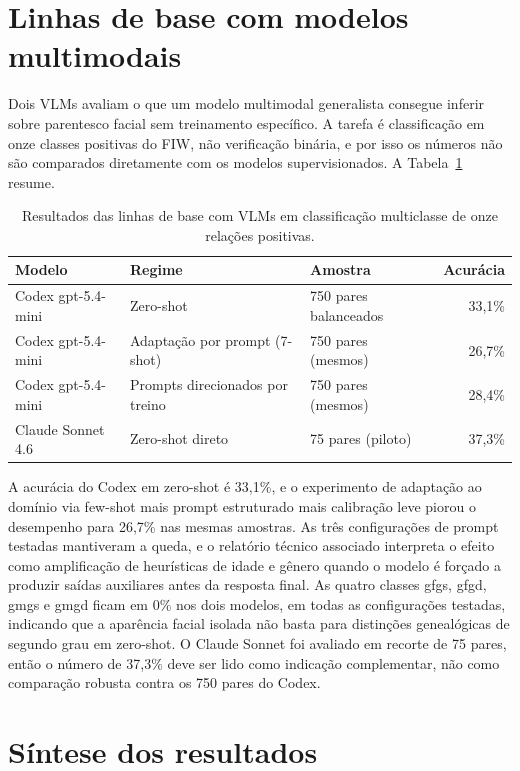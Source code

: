 \section{Linhas de base com modelos multimodais}

Dois VLMs avaliam o que um modelo multimodal generalista consegue inferir sobre parentesco facial sem treinamento específico. A tarefa é classificação em onze classes positivas do FIW, não verificação binária, e por isso os números não são comparados diretamente com os modelos supervisionados. A Tabela~\ref{tab:vlm_resultados} resume.

\begin{table}[h]
\centering
\caption{Resultados das linhas de base com VLMs em classificação multiclasse de onze relações positivas.}
\label{tab:vlm_resultados}
\begin{tabular}{lllr}
\hline
\textbf{Modelo} & \textbf{Regime} & \textbf{Amostra} & \textbf{Acurácia} \\
\hline
Codex gpt-5.4-mini & Zero-shot                          & 750 pares balanceados & 33{,}1\% \\
Codex gpt-5.4-mini & Adaptação por prompt (7-shot)      & 750 pares (mesmos)    & 26{,}7\% \\
Codex gpt-5.4-mini & Prompts direcionados por treino    & 750 pares (mesmos)    & 28{,}4\% \\
Claude Sonnet 4.6  & Zero-shot direto                   & 75 pares (piloto)     & 37{,}3\% \\
\hline
\end{tabular}
\end{table}

A acurácia do Codex em zero-shot é 33,1\%, e o experimento de adaptação ao domínio via few-shot mais prompt estruturado mais calibração leve piorou o desempenho para 26,7\% nas mesmas amostras. As três configurações de prompt testadas mantiveram a queda, e o relatório técnico associado interpreta o efeito como amplificação de heurísticas de idade e gênero quando o modelo é forçado a produzir saídas auxiliares antes da resposta final. As quatro classes gfgs, gfgd, gmgs e gmgd ficam em 0\% nos dois modelos, em todas as configurações testadas, indicando que a aparência facial isolada não basta para distinções genealógicas de segundo grau em zero-shot. O Claude Sonnet foi avaliado em recorte de 75 pares, então o número de 37,3\% deve ser lido como indicação complementar, não como comparação robusta contra os 750 pares do Codex.

\section{Síntese dos resultados}

